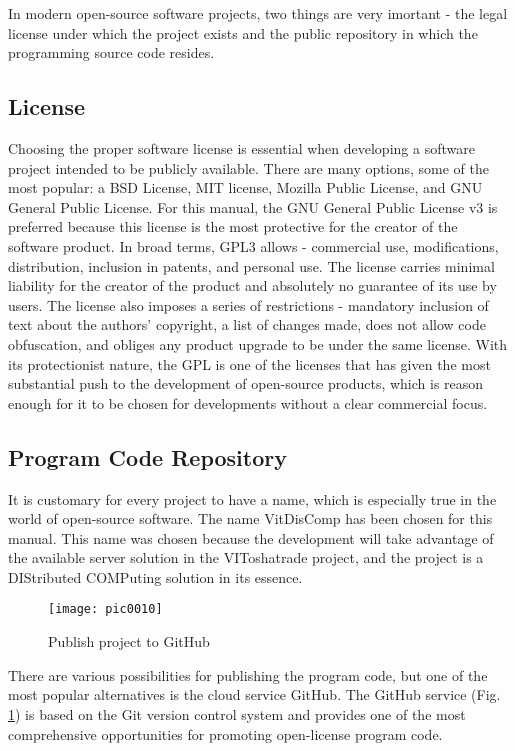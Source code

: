In modern open-source software projects, two things are very imortant - the legal license under which the project exists and the public repository in which the programming source code resides.

\subsection{License}

Choosing the proper software license is essential when developing a software project intended to be publicly available. There are many options, some of the most popular: a BSD License, MIT license, Mozilla Public License, and GNU General Public License. For this manual, the GNU General Public License v3 is preferred because this license is the most protective for the creator of the software product. In broad terms, GPL3 allows - commercial use, modifications, distribution, inclusion in patents, and personal use. The license carries minimal liability for the creator of the product and absolutely no guarantee of its use by users. The license also imposes a series of restrictions - mandatory inclusion of text about the authors' copyright, a list of changes made, does not allow code obfuscation, and obliges any product upgrade to be under the same license. With its protectionist nature, the GPL is one of the licenses that has given the most substantial push to the development of open-source products, which is reason enough for it to be chosen for developments without a clear commercial focus.

\subsection{Program Code Repository}

It is customary for every project to have a name, which is especially true in the world of open-source software. The name VitDisComp has been chosen for this manual. This name was chosen because the development will take advantage of the available server solution in the VIToshatrade \cite{vtrade} project, and the project is a DIStributed COMPuting solution in its essence.

\begin{figure}[h]
\centering
\texttt{[image: pic0010]}
\caption{Publish project to GitHub}
\label{fig:pic0010}
\end{figure}

There are various possibilities for publishing the program code, but one of the most popular alternatives is the cloud service GitHub. The GitHub service (Fig. \ref{fig:pic0010}) is based on the Git version control system and provides one of the most comprehensive opportunities for promoting open-license program code.
